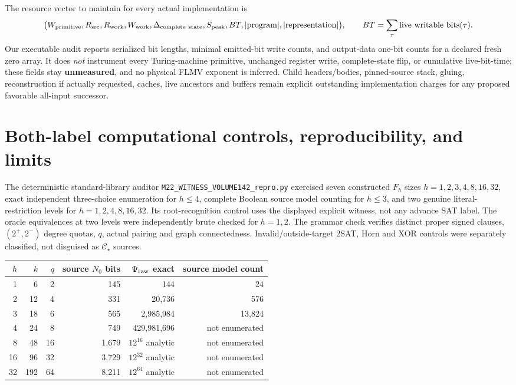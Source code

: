 \documentclass[11pt]{article}
\newcommand{\CS}{\mathcal C_\star}
\begin{document}
The resource vector to maintain for every actual implementation is
\[
 \bigl(W_{\rm primitive},R_{\rm src},R_{\rm work},W_{\rm work},
 \Delta_{\rm complete\ state},S_{\rm peak},BT,|\mathrm{program}|,|\mathrm{representation}|\bigr),
 \qquad BT=\sum_{\tau}\mathrm{live\ writable\ bits}(\tau).
\]
Our executable audit reports serialized bit lengths, minimal emitted-bit write counts, and output-data one-bit counts for a declared fresh zero array. It does \emph{not} instrument every Turing-machine primitive, unchanged register write, complete-state flip, or cumulative live-bit-time; these fields stay \textbf{unmeasured}, and no physical FLMV exponent is inferred. Child headers/bodies, pinned-source stack, gluing, reconstruction if actually requested, caches, live ancestors and buffers remain explicit outstanding implementation charges for any proposed favorable all-input successor.

\section{Both-label computational controls, reproducibility, and limits}
The deterministic standard-library auditor \texttt{M22\_WITNESS\_VOLUME142\_repro.py} exercised seven constructed \(F_h\) sizes \(h=1,2,3,4,8,16,32\), exact independent three-choice enumeration for \(h\le4\), complete Boolean source model counting for \(h\le3\), and two genuine literal-restriction levels for \(h=1,2,4,8,16,32\). Its root-recognition control uses the displayed explicit witness, not any advance SAT label. The oracle equivalences at two levels were independently brute checked for \(h=1,2\). The grammar check verifies distinct proper signed clauses, \((2^+,2^-)\) degree quotas, \(q\), actual pairing and graph connectedness. Invalid/outside-target 2SAT, Horn and XOR controls were separately classified, not disguised as \(\CS\) sources.

\begin{center}\small
\begin{tabular}{rrrrrr}
\toprule
\(h\)&\(k\)&\(q\)&source \(N_0\) bits& \(\Psi_{\rm raw}\) exact& source model count\\\midrule
1&6&2&145&144&24\\
2&12&4&331&20,736&576\\
3&18&6&565&2,985,984&13,824\\
4&24&8&749&429,981,696&not enumerated\\
8&48&16&1,679&\(12^{16}\) analytic&not enumerated\\
16&96&32&3,729&\(12^{32}\) analytic&not enumerated\\
32&192&64&8,211&\(12^{64}\) analytic&not enumerated\\
\bottomrule
\end{tabular}
\end{center}
\end{document}
